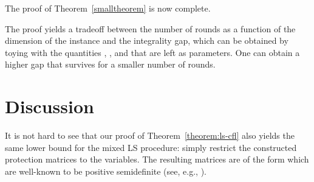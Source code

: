 \documentclass[11pt]{article}\usepackage{amsmath}
\newcommand{\cfl}{{\sc Cfl}}
\begin{document}
The proof of Theorem~\ref{smalltheorem} is now complete.






The proof yields a tradeoff between 
the number of rounds as a function of the dimension of the instance  
and the integrality gap, 
which can be obtained by toying with the quantities , , and  that are
left as parameters. One can obtain a higher gap that survives for a
smaller number of rounds. 







\iffalse ---------- moved before the proof ----------

It is well-known that some simple inequalities are not produced early in the LS procedure.
For example, in the case of \cfl\ 
our proof implies that  rounds
are required to obtain the simple inequality  which is facet-inducing for our instance. 
It is easy to modify the input by adding appropriate clusters of facilities and
clients at a large distance from each other, so that our proof continues to hold 
while inequalities of this flavor  are  satisfied by the bad fractional solution.
This would mean  that such inequalities alone
fail to capture the "core" of the difficulty
of the instance.


\fi 






\section{Discussion}\label{disc}
\label{sec:open}



It is not hard to see that our proof of Theorem~\ref{theorem:ls-cfl} 
also yields the same lower bound 
for the mixed LS \cite{Cornuejols08}
procedure:  simply restrict  the constructed  protection  matrices  to the  
variables. The  resulting matrices  are of the  form    which    are   well-known   to    be   positive   semidefinite
(see, e.g., \cite{GoemansT01}). 
\end{document}
